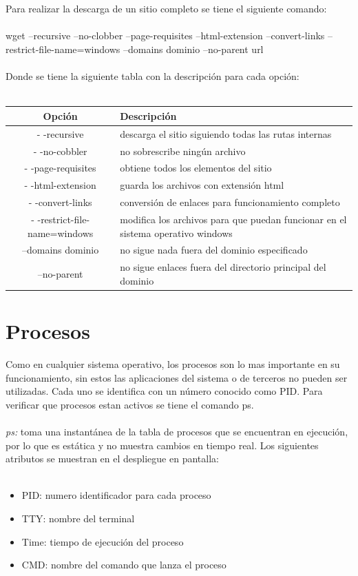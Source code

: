 \documentclass[10pt,a4paper,titlepage]{article}
\begin{document}
	\\
	\\
	Para realizar la descarga de un sitio completo se tiene el siguiente comando:
	\\
	\\
	wget --recursive --no-clobber --page-requisites --html-extension --convert-links --restrict-file-name=windows --domains dominio --no-parent url
	\\
	\\
	Donde se tiene la siguiente tabla con la descripción para cada opción:
	\\
	\\
	\begin{tabular}{|c|p{8cm}|}
		\hline
		Opción & Descripción \\
		\hline
		- -recursive & descarga el sitio siguiendo todas las rutas internas \\
		\hline
		- -no-cobbler & no sobrescribe ningún archivo \\
		\hline 
		- -page-requisites & obtiene todos los elementos del sitio \\
		\hline
		- -html-extension & guarda los archivos con extensión html \\
		\hline
		- -convert-links & conversión de enlaces para funcionamiento completo \\
		\hline
		- -restrict-file-name=windows & modifica los archivos para que puedan funcionar en el sistema operativo windows \\
		\hline
		--domains dominio & no sigue nada fuera del dominio especificado \\
		\hline
		--no-parent & no sigue enlaces fuera del directorio principal del dominio \\
		\hline
	\end{tabular}
	
	\section*{Procesos}
	Como en cualquier sistema operativo, los procesos son lo mas importante en su funcionamiento, sin estos las aplicaciones del sistema o de terceros no pueden ser utilizadas. Cada uno se identifica con un número conocido como PID. Para verificar que procesos estan activos se tiene el comando ps.
	\\
	\\
	\emph{ps:} toma una instantánea de la tabla de procesos que se encuentran en ejecución, por lo que es estática y no muestra cambios en tiempo real. Los siguientes atributos se muestran en el despliegue en pantalla:
	\\
	\\
	\begin{itemize}
		\item PID: numero identificador para cada proceso
		\item TTY: nombre del terminal
		\item Time: tiempo de ejecución del proceso
		\item CMD: nombre del comando que lanza el proceso 
	\end{itemize}
\end{document}
